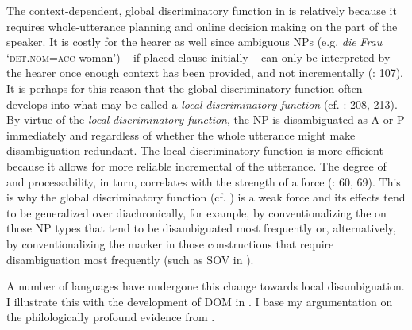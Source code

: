 \documentclass[output=paper]{langsci/langscibook}
\begin{document}
The context-dependent, global discriminatory function in  is relatively  because it requires whole-utterance planning and online decision making on the part of the speaker. It is costly for the hearer as well since ambiguous NPs (e.g.  \textit{die} \textit{Frau} ‘\textsc{det.nom=acc} woman’) – if placed clause-initially – can only be interpreted by the hearer once enough context has been provided, and not incrementally (\citealt{Bornkessel-SchlesewskySchlesewsky2014}: 107). It is perhaps for this reason that the global discriminatory function often develops into what may be called a \textit{local} \textit{discriminatory} \textit{function} (cf. \citealt{Aissen2003,ZeevatJäger2002,Jäger2004,Malchukov2008}: 208, 213). By virtue of the \textit{local} \textit{discriminatory} \textit{function}, the NP is disambiguated as A or P immediately and regardless of whether the whole utterance might make disambiguation redundant. The local discriminatory function is more efficient because it allows for more reliable incremental  of the utterance. The degree of  and processability, in turn, correlates with the strength of a force (\citealt{Hawkins2014_CompMot}: 60, 69). This is why the global discriminatory function (cf. ) is a weak force and its effects tend to be generalized over diachronically, for example, by conventionalizing the  on those NP types that tend to be disambiguated most frequently or, alternatively, by conventionalizing the marker in those constructions that require disambiguation most frequently (such as SOV in ). 

A number of languages have undergone this change towards local disambiguation. I illustrate this with the development of DOM in . I base my argumentation on the philologically profound evidence from \citet{Krysko1994_Russ,Krysko1997_Russ}. 
\end{document}
